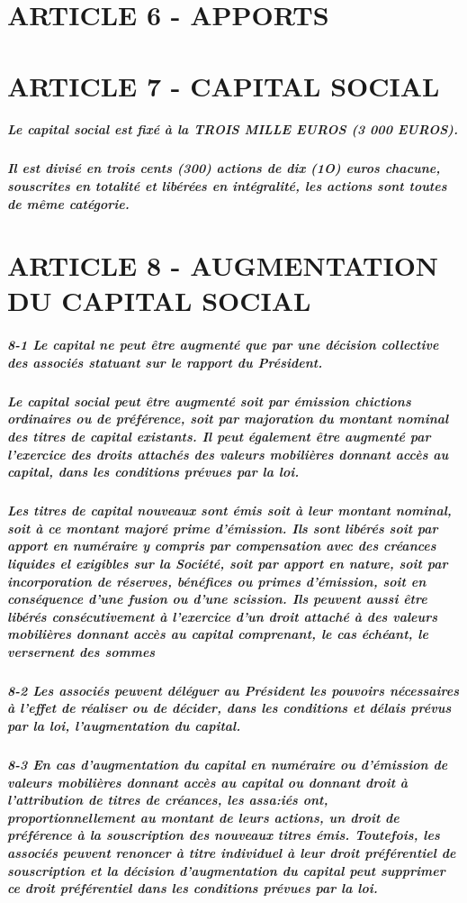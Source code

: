 \documentclass[a4paper, 11pt]{article}
\begin{document}
\section*{ARTICLE 6 - APPORTS}

\section*{ARTICLE 7 - CAPITAL SOCIAL}

\subparagraph{
  Le capital social est fixé à la TROIS MILLE EUROS (3 000 EUROS).
}

\subparagraph{
  Il est divisé en trois cents (300) actions de dix (1O) euros chacune, souscrites en totalité et libérées en intégralité, les actions sont toutes de même catégorie.
}

\section*{ARTICLE 8 - AUGMENTATION DU CAPITAL SOCIAL}

\subparagraph{
  8-1 Le capital ne peut être augmenté que par une décision collective des associés statuant sur le rapport du Président.
}

\subparagraph{
  Le capital social peut être augmenté soit par émission chictions ordinaires ou de préférence, soit par majoration du montant nominal des titres de capital existants. Il peut également être augmenté par l'exercice des droits attachés des valeurs mobilières donnant accès au capital, dans les conditions prévues par la loi.
}

\subparagraph{
  Les titres de capital nouveaux sont émis soit à leur montant nominal, soit à ce montant majoré prime d'émission. Ils sont libérés soit par apport en numéraire y compris par compensation avec des créances liquides el exigibles sur la Société, soit par apport en nature, soit par incorporation de réserves, bénéfices ou primes d'émission, soit en conséquence d'une fusion ou d'une scission. Ils peuvent aussi être libérés consécutivement à l'exercice d'un droit attaché à des valeurs mobilières donnant accès au capital comprenant, le cas échéant, le versernent des sommes
}

\subparagraph{
  8-2 Les associés peuvent déléguer au Président les pouvoirs nécessaires à l'effet de réaliser ou de décider, dans les conditions et délais prévus par la loi, l'augmentation du capital.
}

\subparagraph{
  8-3 En cas d'augmentation du capital en numéraire ou d'émission de valeurs mobilières donnant accès au capital ou donnant droit à l'attribution de titres de créances, les assa:iés ont, proportionnellement au montant de leurs actions, un droit de préférence à la souscription des nouveaux titres émis. Toutefois, les associés peuvent renoncer à titre individuel à leur droit préférentiel de souscription et la décision d'augmentation du capital peut supprimer ce droit préférentiel dans les conditions prévues par la loi.
}
\end{document}
